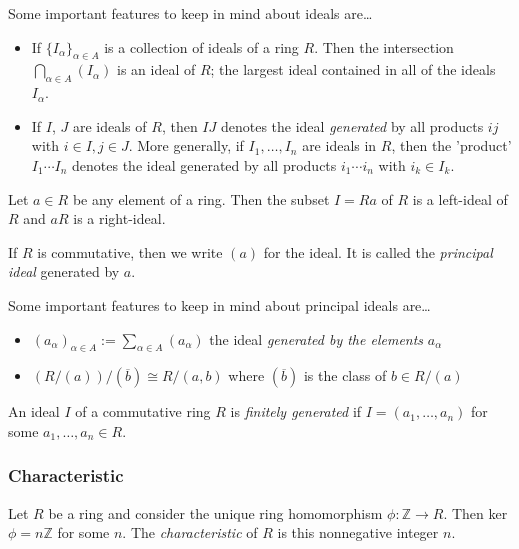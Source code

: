 \noindent Some important features to keep in mind about ideals are\dots
\begin{itemize}
  \item If $\{ I_{\alpha}\}_{\alpha \in A}$ is a collection of ideals of a ring $R$. Then the intersection
  $\bigcap_{\alpha \in A} (I_{\alpha})$ is an ideal of $R$; the largest ideal contained in all of the ideals
  $I_{\alpha}$.
  \item If $I$, $J$ are ideals of $R$, then $IJ$ denotes the ideal \emph{generated} by all products $ij$ with
  $i \in I, j \in J$. More generally, if $I_1, \dots, I_n$ are ideals in $R$, then the 'product' $I_1 \cdots I_n$
  denotes the ideal generated by all products $i_1 \cdots i_n$ with $i_k \in I_k$.
\end{itemize}

\label{principalideal}
Let $a \in R$ be any element of a ring. Then the subset $I = Ra$ of $R$ is a left-ideal of $R$ and $aR$ is a right-ideal.\newline

\noindent If $R$ is commutative, then we write $(a)$ for the ideal. It is called the \emph{principal ideal} generated by $a$.\newline

\noindent Some important features to keep in mind about principal ideals are\dots
\begin{itemize}
  \item $(a_{\alpha})_{\alpha \in A} := \sum_{\alpha \in A} (a_{\alpha})$ the ideal \emph{generated by the elements} $a_{\alpha}$
  \item $(R/(a))/(\overline{b}) \cong R/(a,b)$ where $(\overline{b})$ is the class of $b \in R/(a)$
\end{itemize}

\label{finitelygenerated}
An ideal $I$ of a commutative ring $R$ is \emph{finitely generated} if $I = (a_1,\dots,a_n)$ for some $a_1, \dots, a_n \in R$.

\subsubsection{Characteristic}\label{characteristic}
Let $R$ be a ring and consider the unique ring homomorphism $\phi: \mathbb{Z} \rightarrow R$. Then ker$\phi = n\mathbb{Z}$
for some $n$. The \emph{characteristic} of $R$ is this nonnegative integer $n$.